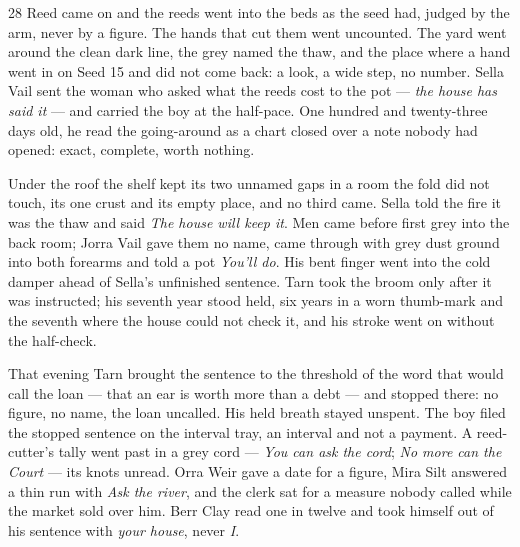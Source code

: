 
\scenebreak


\scenebreak


\scenebreak

\CRtailpiece
\begin{CRchronicle}{28}
Reed came on and the reeds went into the beds as the seed had, judged by the arm, never by a figure. The hands that cut them went uncounted. The yard went around the clean dark line, the grey named the thaw, and the place where a hand went in on Seed 15 and did not come back: a look, a wide step, no number. Sella Vail sent the woman who asked what the reeds cost to the pot --- \emph{the house has said it} --- and carried the boy at the half-pace. One hundred and twenty-three days old, he read the going-around as a chart closed over a note nobody had opened: exact, complete, worth nothing.

Under the roof the shelf kept its two unnamed gaps in a room the fold did not touch, its one crust and its empty place, and no third came. Sella told the fire it was the thaw and said \emph{The house will keep it}. Men came before first grey into the back room; Jorra Vail gave them no name, came through with grey dust ground into both forearms and told a pot \emph{You’ll do}. His bent finger went into the cold damper ahead of Sella’s unfinished sentence. Tarn took the broom only after it was instructed; his seventh year stood held, six years in a worn thumb-mark and the seventh where the house could not check it, and his stroke went on without the half-check.

That evening Tarn brought the sentence to the threshold of the word that would call the loan --- that an ear is worth more than a debt --- and stopped there: no figure, no name, the loan uncalled. His held breath stayed unspent. The boy filed the stopped sentence on the interval tray, an interval and not a payment. A reed-cutter’s tally went past in a grey cord --- \emph{You can ask the cord}; \emph{No more can the Court} --- its knots unread. Orra Weir gave a date for a figure, Mira Silt answered a thin run with \emph{Ask the river}, and the clerk sat for a measure nobody called while the market sold over him. Berr Clay read one in twelve and took himself out of his sentence with \emph{your house}, never \emph{I}.


\end{CRchronicle}
